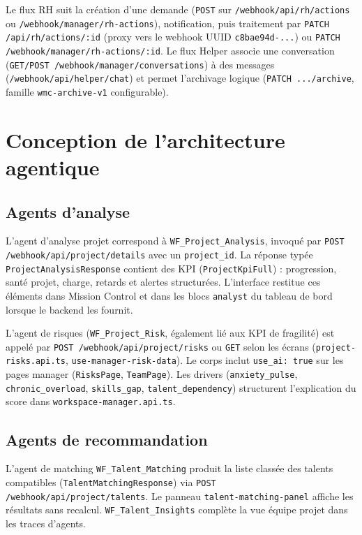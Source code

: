 Le flux RH suit la création d'une demande (\texttt{POST} sur \texttt{/webhook/api/rh/actions} ou \texttt{/webhook/manager/rh-actions}), notification, puis traitement par \texttt{PATCH /api/rh/actions/:id} (proxy vers le webhook UUID \texttt{c8bae94d-...}) ou \texttt{PATCH /webhook/manager/rh-actions/:id}. Le flux Helper associe une conversation (\texttt{GET/POST /webhook/manager/conversations}) à des messages (\texttt{/webhook/api/helper/chat}) et permet l'archivage logique (\texttt{PATCH .../archive}, famille \texttt{wmc-archive-v1} configurable).

\section{Conception de l'architecture agentique}

\subsection{Agents d'analyse}

L'agent d'analyse projet correspond à \texttt{WF\_Project\_Analysis}, invoqué par \texttt{POST /webhook/api/project/details} avec un \texttt{project\_id}. La réponse typée \texttt{ProjectAnalysisResponse} contient des KPI (\texttt{ProjectKpiFull}) : progression, santé projet, charge, retards et alertes structurées. L'interface restitue ces éléments dans Mission Control et dans les blocs \texttt{analyst} du tableau de bord lorsque le backend les fournit.

L'agent de risques (\texttt{WF\_Project\_Risk}, également lié aux KPI de fragilité) est appelé par \texttt{POST /webhook/api/project/risks} ou \texttt{GET} selon les écrans (\texttt{project-risks.api.ts}, \texttt{use-manager-risk-data}). Le corps inclut \texttt{use\_ai: true} sur les pages manager (\texttt{RisksPage}, \texttt{TeamPage}). Les drivers (\texttt{anxiety\_pulse}, \texttt{chronic\_overload}, \texttt{skills\_gap}, \texttt{talent\_dependency}) structurent l'explication du score dans \texttt{workspace-manager.api.ts}.

\subsection{Agents de recommandation}

L'agent de matching \texttt{WF\_Talent\_Matching} produit la liste classée des talents compatibles (\texttt{TalentMatchingResponse}) via \texttt{POST /webhook/api/project/talents}. Le panneau \texttt{talent-matching-panel} affiche les résultats sans recalcul. \texttt{WF\_Talent\_Insights} complète la vue équipe projet dans les traces d'agents.


